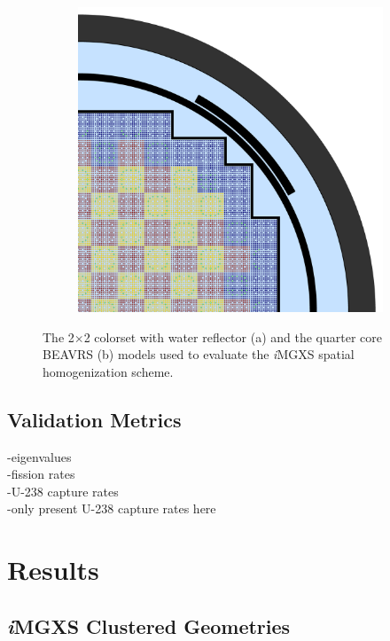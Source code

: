 \documentclass[12pt,twoside]{mitthesis-exec}
\begin{document}
\begin{figure}[h!]
\begin{subfigure}{0.47\textwidth}
  \includegraphics[width=0.93\linewidth]{figures/benchmarks/quarter-core}
  \caption{}
  \label{fig:full-core}
\end{subfigure}
\caption[PWR benchmarks]{The 2$\times$2 colorset with water reflector (a) and the quarter core BEAVRS (b) models used to evaluate the \textit{i}MGXS spatial homogenization scheme.}
\label{fig:benchmarks}
\end{figure}

\subsection*{Validation Metrics}

-eigenvalues \\
-fission rates \\
-U-238 capture rates \\
-only present U-238 capture rates here \\

\clearpage

\section*{Results}

\subsection*{\textit{i}MGXS Clustered Geometries}
\end{document}
